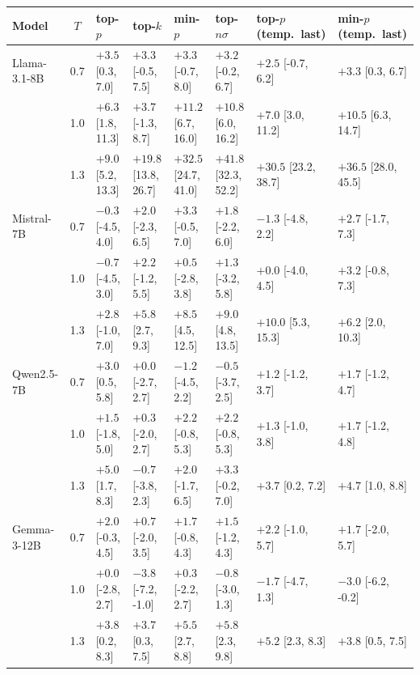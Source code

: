 \begin{tabular}{lcllllll}
\toprule
Model & $T$ & top-$p$ & top-$k$ & min-$p$ & top-$n\sigma$ & top-$p$ (temp.\ last) & min-$p$ (temp.\ last) \\
\midrule
Llama-3.1-8B & 0.7 & $\mathbf{+3.5}$ [0.3, 7.0] & $+3.3$ [-0.5, 7.5] & $+3.3$ [-0.7, 8.0] & $+3.2$ [-0.2, 6.7] & $+2.5$ [-0.7, 6.2] & $\mathbf{+3.3}$ [0.3, 6.7] \\
 & 1.0 & $\mathbf{+6.3}$ [1.8, 11.3] & $+3.7$ [-1.3, 8.7] & $\mathbf{+11.2}$ [6.7, 16.0] & $\mathbf{+10.8}$ [6.0, 16.2] & $\mathbf{+7.0}$ [3.0, 11.2] & $\mathbf{+10.5}$ [6.3, 14.7] \\
 & 1.3 & $\mathbf{+9.0}$ [5.2, 13.3] & $\mathbf{+19.8}$ [13.8, 26.7] & $\mathbf{+32.5}$ [24.7, 41.0] & $\mathbf{+41.8}$ [32.3, 52.2] & $\mathbf{+30.5}$ [23.2, 38.7] & $\mathbf{+36.5}$ [28.0, 45.5] \\
\midrule
Mistral-7B & 0.7 & $-0.3$ [-4.5, 4.0] & $+2.0$ [-2.3, 6.5] & $+3.3$ [-0.5, 7.0] & $+1.8$ [-2.2, 6.0] & $-1.3$ [-4.8, 2.2] & $+2.7$ [-1.7, 7.3] \\
 & 1.0 & $-0.7$ [-4.5, 3.0] & $+2.2$ [-1.2, 5.5] & $+0.5$ [-2.8, 3.8] & $+1.3$ [-3.2, 5.8] & $+0.0$ [-4.0, 4.5] & $+3.2$ [-0.8, 7.3] \\
 & 1.3 & $+2.8$ [-1.0, 7.0] & $\mathbf{+5.8}$ [2.7, 9.3] & $\mathbf{+8.5}$ [4.5, 12.5] & $\mathbf{+9.0}$ [4.8, 13.5] & $\mathbf{+10.0}$ [5.3, 15.3] & $\mathbf{+6.2}$ [2.0, 10.3] \\
\midrule
Qwen2.5-7B & 0.7 & $\mathbf{+3.0}$ [0.5, 5.8] & $+0.0$ [-2.7, 2.7] & $-1.2$ [-4.5, 2.2] & $-0.5$ [-3.7, 2.5] & $+1.2$ [-1.2, 3.7] & $+1.7$ [-1.2, 4.7] \\
 & 1.0 & $+1.5$ [-1.8, 5.0] & $+0.3$ [-2.0, 2.7] & $+2.2$ [-0.8, 5.3] & $+2.2$ [-0.8, 5.3] & $+1.3$ [-1.0, 3.8] & $+1.7$ [-1.2, 4.8] \\
 & 1.3 & $\mathbf{+5.0}$ [1.7, 8.3] & $-0.7$ [-3.8, 2.3] & $+2.0$ [-1.7, 6.5] & $+3.3$ [-0.2, 7.0] & $\mathbf{+3.7}$ [0.2, 7.2] & $\mathbf{+4.7}$ [1.0, 8.8] \\
\midrule
Gemma-3-12B & 0.7 & $+2.0$ [-0.3, 4.5] & $+0.7$ [-2.0, 3.5] & $+1.7$ [-0.8, 4.3] & $+1.5$ [-1.2, 4.3] & $+2.2$ [-1.0, 5.7] & $+1.7$ [-2.0, 5.7] \\
 & 1.0 & $+0.0$ [-2.8, 2.7] & $-3.8$ [-7.2, -1.0] & $+0.3$ [-2.2, 2.7] & $-0.8$ [-3.0, 1.3] & $-1.7$ [-4.7, 1.3] & $-3.0$ [-6.2, -0.2] \\
 & 1.3 & $\mathbf{+3.8}$ [0.2, 8.3] & $\mathbf{+3.7}$ [0.3, 7.5] & $\mathbf{+5.5}$ [2.7, 8.8] & $\mathbf{+5.8}$ [2.3, 9.8] & $\mathbf{+5.2}$ [2.3, 8.3] & $\mathbf{+3.8}$ [0.5, 7.5] \\

\end{tabular}
